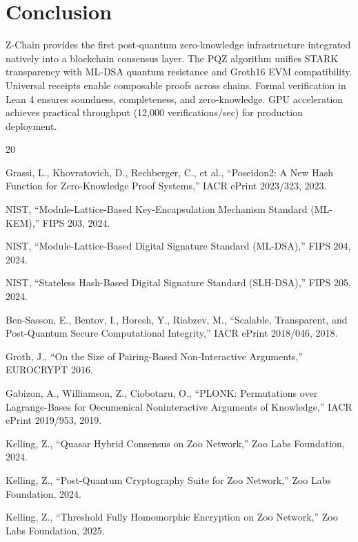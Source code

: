 \section{Conclusion}


Z-Chain provides the first post-quantum zero-knowledge infrastructure integrated natively into a blockchain consensus layer. The PQZ algorithm unifies STARK transparency with ML-DSA quantum resistance and Groth16 EVM compatibility. Universal receipts enable composable proofs across chains. Formal verification in Lean 4 ensures soundness, completeness, and zero-knowledge. GPU acceleration achieves practical throughput (12,000 verifications/sec) for production deployment.

\begin{thebibliography}{20}

Grassi, L., Khovratovich, D., Rechberger, C., et al., ``Poseidon2: A New Hash Function for Zero-Knowledge Proof Systems,'' IACR ePrint 2023/323, 2023.

NIST, ``Module-Lattice-Based Key-Encapsulation Mechanism Standard (ML-KEM),'' FIPS 203, 2024.

NIST, ``Module-Lattice-Based Digital Signature Standard (ML-DSA),'' FIPS 204, 2024.

NIST, ``Stateless Hash-Based Digital Signature Standard (SLH-DSA),'' FIPS 205, 2024.

Ben-Sasson, E., Bentov, I., Horesh, Y., Riabzev, M., ``Scalable, Transparent, and Post-Quantum Secure Computational Integrity,'' IACR ePrint 2018/046, 2018.

Groth, J., ``On the Size of Pairing-Based Non-Interactive Arguments,'' EUROCRYPT 2016.

Gabizon, A., Williamson, Z., Ciobotaru, O., ``PLONK: Permutations over Lagrange-Bases for Oecumenical Noninteractive Arguments of Knowledge,'' IACR ePrint 2019/953, 2019.

Kelling, Z., ``Quasar Hybrid Consensus on Zoo Network,'' Zoo Labs Foundation, 2024.

Kelling, Z., ``Post-Quantum Cryptography Suite for Zoo Network,'' Zoo Labs Foundation, 2024.

Kelling, Z., ``Threshold Fully Homomorphic Encryption on Zoo Network,'' Zoo Labs Foundation, 2025.

\end{thebibliography}

